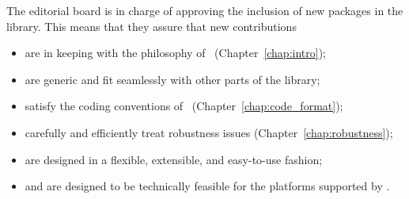 



The editorial board is in charge of approving the inclusion of new packages
in the library.  This means that they assure that new contributions
\begin{itemize}
   \item are in keeping with the philosophy of \cgal\ (Chapter~\ref{chap:intro});
   \item are generic and fit seamlessly with other parts of the library;
   \item satisfy the coding conventions of \cgal\ (Chapter~\ref{chap:code_format});
   \item carefully and efficiently treat robustness issues
         (Chapter~\ref{chap:robustness});
   \item are designed in a flexible, extensible, and easy-to-use fashion;
   \item and are designed to be technically feasible for the platforms
         supported by \cgal.
\end{itemize}

